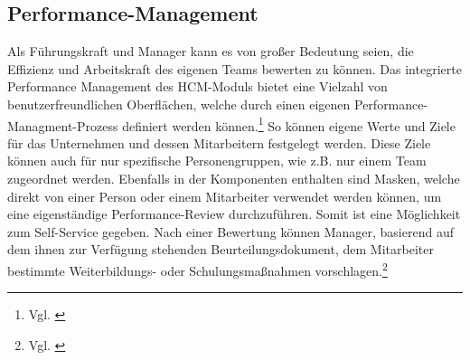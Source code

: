 \subsection{Performance-Management}
Als Führungskraft und Manager kann es von großer Bedeutung seien, die Effizienz und Arbeitskraft des eigenen Teams bewerten zu können.
Das integrierte Performance Management des HCM-Moduls bietet eine Vielzahl von benutzerfreundlichen Oberflächen, welche durch einen eigenen Performance-Managment-Prozess definiert werden können.\footnote{Vgl. \cite{SAPSE2024d}}
So können eigene Werte und Ziele für das Unternehmen und dessen Mitarbeitern festgelegt werden.
Diese Ziele können auch für nur spezifische Personengruppen, wie z.B. nur einem Team zugeordnet werden.
Ebenfalls in der Komponenten enthalten sind Masken, welche direkt von einer Person oder einem Mitarbeiter verwendet werden können, um eine eigenständige Performance-Review durchzuführen.
Somit ist eine Möglichkeit zum Self-Service gegeben. Nach einer Bewertung können Manager, basierend auf dem ihnen zur Verfügung stehenden Beurteilungsdokument, dem Mitarbeiter bestimmte Weiterbildungs- oder Schulungsmaßnahmen vorschlagen.\footnote{Vgl. \cite{SAPSE2024d}}

\newpage